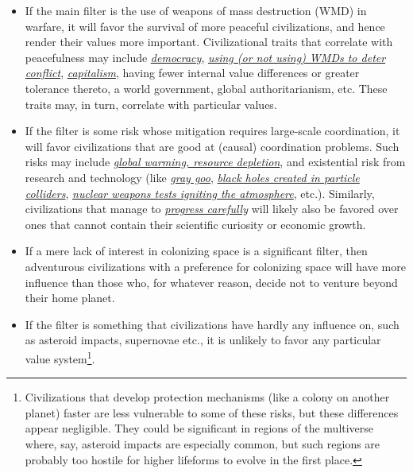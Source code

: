 \documentclass[]{article}
\begin{document}
\begin{itemize}
\item
  If the main filter is the use of weapons of mass destruction (WMD) in
  warfare, it will favor the survival of more peaceful civilizations,
  and hence render their values more important. Civilizational traits
  that correlate with peacefulness may include
  \href{https://en.wikipedia.org/wiki/Democratic_peace_theory}{\emph{democracy}},
  \href{https://en.wikipedia.org/wiki/Nuclear_peace}{\emph{using (or not
  using) WMDs to deter conflict}},
  \href{https://en.wikipedia.org/wiki/Capitalist_peace}{\emph{capitalism}},
  having fewer internal value differences or greater tolerance thereto,
  a world government, global authoritarianism, etc. These traits may, in
  turn, correlate with particular values.
\item
  If the filter is some risk whose mitigation requires large-scale
  coordination, it will favor civilizations that are good at (causal)
  coordination problems. Such risks may include
  \href{https://en.wikipedia.org/wiki/Fermi_paradox\#Resource_depletion_and_climate_change}{\emph{global
  warming, resource depletion}}, and existential risk from research and
  technology (like
  \href{https://en.wikipedia.org/wiki/Grey_goo}{\emph{gray goo}},
  \href{https://en.wikipedia.org/wiki/Safety_of_high-energy_particle_collision_experiments}{\emph{black
  holes created in particle colliders}},
  \href{https://fas.org/sgp/othergov/doe/lanl/docs1/00329010.pdf}{\emph{nuclear
  weapons tests igniting the atmosphere}}, etc.). Similarly,
  civilizations that manage to
  \href{https://foundational-research.org/differential-intellectual-progress-as-a-positive-sum-project/}{\emph{progress
  carefully}} will likely also be favored over ones that cannot contain
  their scientific curiosity or economic growth.
\item
  If a mere lack of interest in colonizing space is a significant
  filter, then adventurous civilizations with a preference for
  colonizing space will have more influence than those who, for whatever
  reason, decide not to venture beyond their home planet.
\item
  If the filter is something that civilizations have hardly any
  influence on, such as asteroid impacts, supernovae etc., it is
  unlikely to favor any particular value system\footnote{Civilizations
    that develop protection mechanisms (like a colony on another planet)
    faster are less vulnerable to some of these risks, but these
    differences appear negligible. They could be significant in regions
    of the multiverse where, say, asteroid impacts are especially
    common, but such regions are probably too hostile for higher
    lifeforms to evolve in the first place.}.
\end{itemize}
\end{document}
